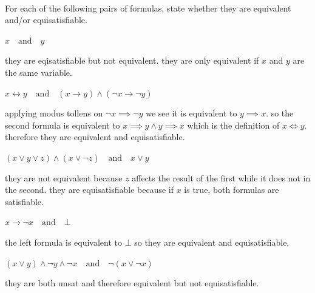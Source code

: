 \documentclass[11pt]{article}
\begin{document}
\begin{qunlist}
  \\
  For each of the following pairs of formulas, state whether they are equivalent and/or equisatisfiable.
  \begin{qparts}
  \item
    $x \quad\text{and}\quad y$

    \begin{answer}
      they are eqisatisfiable but not equivalent. they are only equivalent if \(x\) and \(y\) are the same variable.
    \end{answer}

  \item
    $x \leftrightarrow y \quad\text{and}\quad  (x \rightarrow y) \land (\lnot x \rightarrow \lnot y)$

    \begin{answer}
      applying modus tollens on \(\neg x \implies \neg y\) we see it is equivalent to \(y \implies x\). so the second formula is equivalent to \(x \implies y \land y \implies x\) which is the definition of \(x \iff y\). therefore they are equivalent and equisatisfiable.
    \end{answer}

  \item
    $(x \lor y \lor z) \land (x  \lor \lnot z) \quad\text{and}\quad x \lor y$

    \begin{answer}
      they are not equivalent because \(z\) affects the result of the first while it does not in the second. they are equisatisfiable because if \(x\) is true, both formulas are satisfiable.
    \end{answer}

  \item
    $x \rightarrow \lnot x \quad\text{and}\quad \bot$

    \begin{answer}
      the left formula is equivalent to \(\bot \) so they are equivalent and equisatisfiable.
    \end{answer}

  \item
    $(x \lor y) \land \lnot y \land \lnot x \quad\text{and}\quad \lnot (x \lor \lnot x)$

    \begin{answer}
      they are both unsat and therefore equivalent but not equisatisfiable.
    \end{answer}
  \end{qparts}


\end{qunlist}
\end{document}

